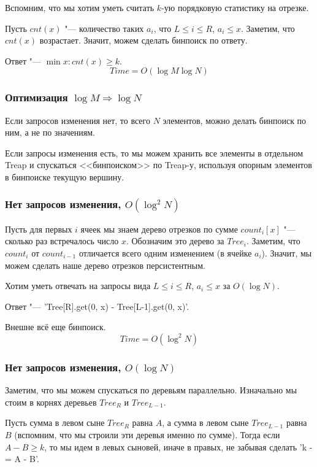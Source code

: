 Вспомним, что мы хотим уметь считать $k$-ую порядковую статистику на отрезке.
			
Пусть $cnt(x)$ "--- количество таких $a_i$, что $L \le i \le R$, $a_i \le x$.
Заметим, что $cnt(x)$ возрастает.
Значит, можем сделать бинпоиск по ответу.
			
Ответ "--- $\min x: cnt(x) \ge k$.
\[ Time = O(\log M \log N) \]

\subsubsection{Оптимизация $\log M \Rightarrow \log N$}

Если запросов изменения нет, то всего $N$ элементов, можно делать бинпоиск по ним, а не по значениям.

Если запросы изменения есть, то мы можем хранить все элементы в отдельном Treap и спускаться <<бинпоиском>> по Treap-у,
используя опорным элементов в бинпоиске текущую вершину.
			
\subsubsection{Нет запросов изменения, $O(\log^2 N)$}

Пусть для первых $i$ ячеек мы знаем дерево отрезков по сумме $count_i[x]$ "--- сколько раз встречалось число $x$. Обозначим это дерево за $Tree_i$.
Заметим, что $count_i$ от $count_{i-1}$ отличается всего одним изменением (в ячейке $a_i$).
Значит, мы можем сделать наше дерево отрезков персистентным.

Хотим уметь отвечать на запросы вида $L \le i \le R$, $a_i \le x$ за $O(\log N)$.

Ответ "--- \cpp'Tree[R].get(0, x) - Tree[L-1].get(0, x)'.
				
Внешне всё еще бинпоиск.
\[ Time = O(\log^2 N) \]

\subsubsection{Нет запросов изменения, $O(\log N)$}

Заметим, что мы можем спускаться по деревьям параллельно.
Изначально мы стоим в корнях деревьев $Tree_R$ и $Tree_{L-1}$.

Пусть сумма в левом сыне $Tree_R$ равна $A$, а сумма в левом сыне $Tree_{L-1}$ равна $B$ (вспомним, что мы строили эти деревья именно по сумме).
Тогда если $A-B \ge k$, то мы идем в левых сыновей, иначе в правых, не забывая сделать \cpp'k -= A - B'.

